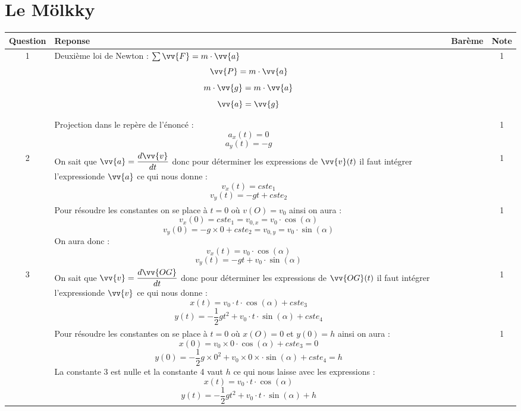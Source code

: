 \documentclass[a4paper,11pt,fleqn]{article}%
\begin{document}
\maketitle

\section{Le Mölkky}

\begin{longtable}{|c|m{.7\linewidth}|c|c|}
    \hline
    \tabletail{\hline}
    Question & \centering Reponse & Barème & Note\\
    \hline
    1 & Deuxième loi de Newton : $\sum{\vv{F} = m\cdot \vv{a}}$ 
    $$ \vv{P} = m\cdot \vv{a}$$
    $$ m\cdot \vv{g} = m\cdot \vv{a}$$
    $$\vv{a} = \vv{g}$$ & & 1 \\
     & Projection dans le repère de l'énoncé : 
     $$a_x(t) = 0$$ $$a_y(t) = -g$$ & & 1\\
    \hline

    2 & On sait que $\vv{a} = \dfrac{d\vv{v}}{dt}$ donc pour déterminer les expressions de $\vv{v}(t)$ il faut intégrer l'expressionde $\vv{a}$ ce qui nous donne :
    $$v_x(t) = cste_1 $$ $$v_y(t) = -gt + cste_2 $$& & 1\\
    & Pour résoudre les constantes on se place à $t=0$ où $v(O) = v_0$ ainsi on aura : $$ v_x(0) = cste_1 = v_{0,x} = v_0\cdot \cos(\alpha)$$
    $$ v_y(0) = -g\times 0 + cste_2 =  v_{0,y} = v_0\cdot \sin(\alpha)$$ 
    On aura donc : $$v_x(t) = v_0\cdot \cos(\alpha) $$ $$v_y(t) = -gt + v_0\cdot \sin(\alpha)$$& &1\\
    \hline

    3 & On sait que $\vv{v} = \dfrac{d\vv{OG}}{dt}$ donc pour déterminer les expressions de $\vv{OG}(t)$ il faut intégrer l'expressionde $\vv{v}$ ce qui nous donne :
    $$ x(t) = v_0 \cdot t\cdot \cos(\alpha) + cste_3$$ $$ y(t) = -\frac{1}{2}gt^2  + v_0 \cdot t \cdot \sin(\alpha) + cste_4$$
    & & 1\\
    & Pour résoudre les constantes on se place à $t=0$ où $x(O) = 0$ et $y(0) = h$ ainsi on aura : $$ x(0) = v_0 \times 0 \cdot \cos(\alpha) + cste_3= 0 $$
    $$ y(0) = -\frac{1}{2}g\times 0^2  + v_0 \times 0 \times \cdot \sin(\alpha) + cste_4 =  h $$ 
    La constante 3 est nulle et la constante 4 vaut $h$ ce qui nous laisse avec les expressions : 
    $$ x(t) = v_0 \cdot t\cdot \cos(\alpha)$$ $$ y(t) = -\frac{1}{2}gt^2  + v_0 \cdot t \cdot \sin(\alpha)+ h$$
    & & 1\\
    \hline


\end{longtable}
\end{document}
